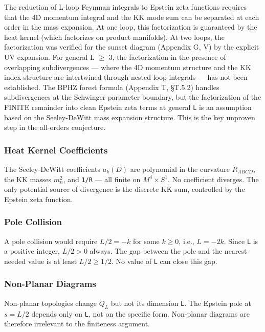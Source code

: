 \documentclass[aps,prd,preprint,superscriptaddress,longbibliography,floatfix]{revtex4-2}
\theoremstyle{remark}
\begin{document}
The reduction of L-loop Feynman integrals to Epstein zeta functions requires that the 4D momentum integral and the KK mode sum can be separated at each order in the mass expansion. At one loop, this factorization is guaranteed by the heat kernel (which factorizes on product manifolds). At two loops, the factorization was verified for the sunset diagram (Appendix G, V) by the explicit UV expansion. For general L $\geq$ 3, the factorization in the presence of overlapping subdivergences --- where the 4D momentum structure and the KK index structure are intertwined through nested loop integrals --- has not been established. The BPHZ forest formula (Appendix T, \S{}T.5.2) handles subdivergences at the Schwinger parameter boundary, but the factorization of the FINITE remainder into clean Epstein zeta terms at general \texttt{L} is an assumption based on the Seeley-DeWitt mass expansion structure. This is the key unproven step in the all-orders conjecture.


\subsubsection{Heat Kernel Coefficients}

The Seeley-DeWitt coefficients $a_k(D)$ are polynomial in the curvature $R_{ABCD}$, the KK masses $m_n^{2}$, and \texttt{1/R} --- all finite on $M^{4} \times S^{1}$. No coefficient diverges. The only potential source of divergence is the discrete KK sum, controlled by the Epstein zeta function.


\subsubsection{Pole Collision}

A pole collision would require $L/2 = -k$ for some $k \geq 0$, i.e., $L = -2k$. Since \texttt{L} is a positive integer, $L/2 > 0$ always. The gap between the pole and the nearest needed value is at least $L/2 \geq 1/2$. No value of \texttt{L} can close this gap.


\subsubsection{Non-Planar Diagrams}

Non-planar topologies change $Q_L$ but not its dimension \texttt{L}. The Epstein pole at $s = L/2$ depends only on \texttt{L}, not on the specific form. Non-planar diagrams are therefore irrelevant to the finiteness argument.
\end{document}
